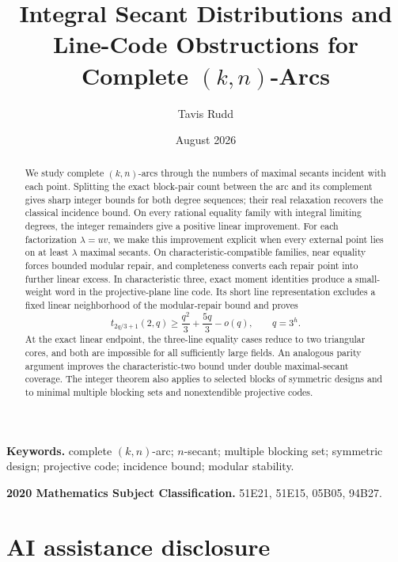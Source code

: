 \documentclass[11pt]{article}
\title{Integral Secant Distributions and Line-Code Obstructions for Complete
\((k,n)\)-Arcs}
\author{Tavis Rudd}
\date{August 2026}
\numberwithin{equation}{section}
\theoremstyle{definition}
\theoremstyle{remark}
\begin{document}
\maketitle

\begin{abstract}
We study complete \((k,n)\)-arcs through the numbers of maximal secants
incident with each point.  Splitting the exact block-pair count between the
arc and its complement gives sharp integer bounds for both degree sequences;
their real relaxation recovers the classical incidence bound.  On every
rational equality family with integral limiting degrees, the integer
remainders give a positive linear improvement.  For each factorization
\(\lambda=uv\), we make this improvement explicit when every external point
lies on at least \(\lambda\) maximal secants.  On
characteristic-compatible families, near equality forces bounded modular
repair, and completeness converts each repair point into further linear
excess.  In characteristic three, exact moment identities produce a
small-weight word in the projective-plane line code.  Its short line
representation excludes a fixed linear neighborhood of the modular-repair
bound and proves
\[
 t_{2q/3+1}(2,q)\ge \frac{q^2}{3}+\frac{5q}{3}-o(q),
 \qquad q=3^h.
\]
At the exact linear endpoint, the three-line equality cases reduce to two
triangular cores, and both are impossible for all sufficiently large fields.
An analogous parity argument improves the characteristic-two bound under
double maximal-secant coverage.  The integer theorem also applies to selected
blocks of symmetric designs and to minimal multiple blocking sets and
nonextendible projective codes.
\end{abstract}

\noindent\textbf{Keywords.} complete \((k,n)\)-arc; \(n\)-secant; multiple
blocking set; symmetric design; projective code; incidence bound; modular
stability.

\smallskip
\noindent\textbf{2020 Mathematics Subject Classification.} 51E21, 51E15,
05B05, 94B27.










\section*{AI assistance disclosure}
\end{document}
